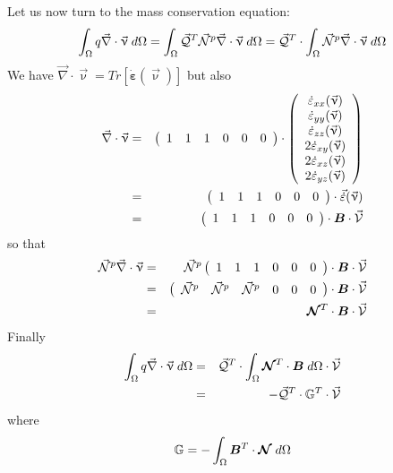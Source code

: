 Let us now turn to the mass conservation equation:
\[
\int_\Omega q \vec\nabla \cdot \vec{\upnu} \; d\Omega 
=\int_\Omega \vec{\cal Q}^T \vec{\cal N}^p \vec\nabla \cdot \vec{\upnu} \; d\Omega  
=\vec{\cal Q}^T \cdot \int_\Omega \vec{\cal N}^p \vec\nabla \cdot \vec{\upnu} \; d\Omega  
\]
We have $\vec\nabla \cdot \vec{\upnu} = Tr[\dot{\bm \varepsilon}(\vec\upnu)]$ but also 
\begin{eqnarray}
\vec\nabla \cdot \vec{\upnu} 
&=& 
\left(
\begin{array}{cccccc}
1 & 1 & 1 & 0 & 0 & 0
\end{array}
\right)
\cdot
\left(
\begin{array}{c}
\dot \varepsilon_{xx}(\vec\upnu) \\
\dot \varepsilon_{yy}(\vec\upnu) \\
\dot \varepsilon_{zz}(\vec\upnu) \\
2\dot \varepsilon_{xy}(\vec\upnu)\\ 
2\dot \varepsilon_{xz}(\vec\upnu)\\
2\dot \varepsilon_{yz}(\vec\upnu) 
\end{array}
\right) \nonumber\\
&=&
\left(
\begin{array}{cccccc}
1 & 1 & 1 & 0 & 0 & 0
\end{array}
\right)
\cdot
\vec{\dot \varepsilon}(\vec\upnu)  \nonumber\\
&=&
\left(
\begin{array}{cccccc}
1 & 1 & 1 & 0 & 0 & 0
\end{array}
\right)
\cdot
{\bm B} \cdot \vec{\cal V}
\end{eqnarray}
so that 
\begin{eqnarray}
\vec{\cal N}^p  \vec\nabla \cdot \vec{\upnu}
&=& \vec{\cal N}^p  
\left(
\begin{array}{cccccc}
1 & 1 & 1 & 0 & 0 & 0
\end{array}
\right)
\cdot
{\bm B} \cdot \vec{\cal V} \nonumber\\
&=&
\left(
\begin{array}{cccccc}
\vec{\cal N}^p & \vec{\cal N}^p & \vec{\cal N}^p & 0 & 0 & 0
\end{array}
\right)
\cdot
{\bm B} \cdot \vec{\cal V} \nonumber\\
&=&
{\bm {{\mathcal{N}}}}^T \cdot {\bm B} \cdot \vec{\cal V}
\end{eqnarray}
Finally 
\begin{eqnarray}
\int_\Omega q \vec\nabla \cdot \vec{\upnu} \; d\Omega 
&=& \vec{\cal Q}^T \cdot \int_\Omega {\bm {{\mathcal{N}}}}^T \cdot {\bm B} \; d\Omega \cdot \vec{\cal V} \nonumber\\
&=& - \vec{\cal Q}^T \cdot \mathbb{G}^T \cdot \vec{\cal V} 
\end{eqnarray}
where 
\[
\mathbb{G} = -\int_\Omega {\bm B}^T \cdot {\bm {{\mathcal{N}}}}\; d\Omega 
\]

